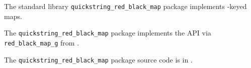 
The standard library {\tt quickstring\_red\_black\_map} package implements 
-keyed maps.

The {\tt quickstring\_red\_black\_map} package implements the  API 
via {\tt red\_black\_map\_g} from 
.

The {\tt quickstring\_red\_black\_map} package source code is in .

